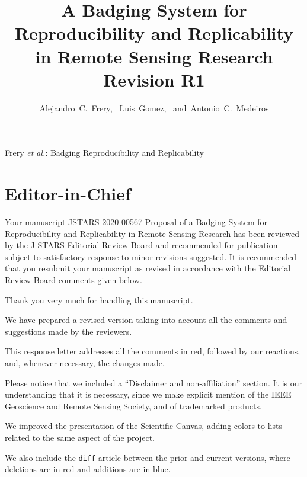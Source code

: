 \documentclass[journal,onecolumn,12pt]{IEEEtran}
\begin{document}
\title{A Badging System for Reproducibility and Replicability in Remote Sensing Research\\
	Revision R1}

\author{Alejandro~C.~Frery,~
	Luis~Gomez,~
	and~Antonio~C.~Medeiros}

%
{Frery \MakeLowercase{\textit{et al.}}: Badging Reproducibility and Replicability}

\maketitle

\IEEEpeerreviewmaketitle

\section{Editor-in-Chief}
\begin{tcolorbox}[colback=red!5!white,colframe=red!75!black,title=Comment \#1]
Your manuscript JSTARS-2020-00567 Proposal of a Badging System for Reproducibility and Replicability in Remote Sensing Research has been reviewed by the J-STARS Editorial Review Board and recommended for publication subject to satisfactory response to minor revisions suggested. It is recommended that you resubmit your manuscript as revised in accordance with the Editorial Review Board comments given below.
\end{tcolorbox}

Thank you very much for handling this manuscript.

We have prepared a revised version taking into account all the comments and suggestions made by the reviewers.

This response letter addresses all the comments in red, followed by
our reactions, and, whenever necessary, the changes made.

Please notice that we included a ``Disclaimer and non-affiliation'' section.
It is our understanding that it is necessary, since we make explicit mention of the IEEE Geoscience and Remote Sensing Society, and of trademarked products.

We improved the presentation of the Scientific Canvas, adding colors to lists related to the same aspect of the project.

We also include the \texttt{diff} article between the prior and current versions, where deletions are in red and additions are in blue.
\end{document}
